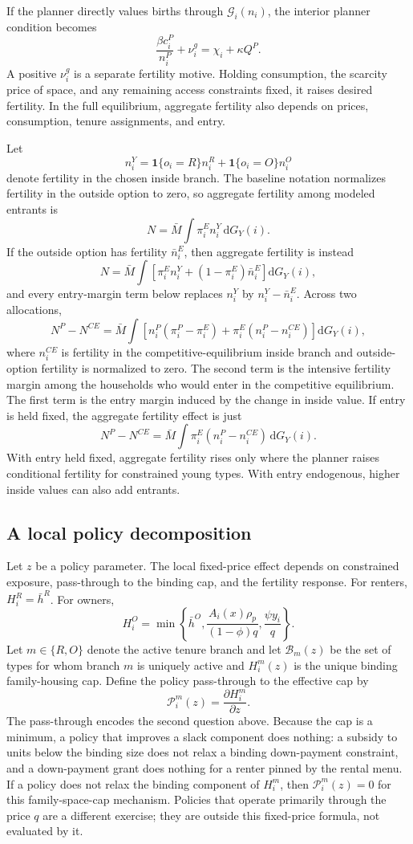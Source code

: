 \documentclass[11pt]{article}
\newcommand{\dd}{\mathrm d}
\newcommand{\1}{\mathbf 1}
\begin{document}
If the planner directly values births through $\mathcal G_i(n_i)$, the interior planner condition becomes
\[
\frac{\beta c_i^P}{n_i^P}+\nu_i^g
=
\chi_i+\kappa Q^{P}.
\]
A positive $\nu_i^g$ is a separate fertility motive. Holding consumption, the scarcity price of space, and any remaining access constraints fixed, it raises desired fertility. In the full equilibrium, aggregate fertility also depends on prices, consumption, tenure assignments, and entry.

Let
\[
n_i^Y=\1\{o_i=R\}n_i^R+\1\{o_i=O\}n_i^O
\]
denote fertility in the chosen inside branch. The baseline notation normalizes fertility in the outside option to zero, so aggregate fertility among modeled entrants is
\[
N
=
\bar M\int \pi_i^E n_i^Y\,\dd G_Y(i).
\]
If the outside option has fertility $\bar n_i^E$, then aggregate fertility is instead
\[
N
=
\bar M\int
\left[
\pi_i^E n_i^Y+(1-\pi_i^E)\bar n_i^E
\right]\dd G_Y(i),
\]
and every entry-margin term below replaces $n_i^Y$ by $n_i^Y-\bar n_i^E$.
Across two allocations,
\[
N^P-N^{CE}
=
\bar M\int
\left[
n_i^P(\pi_i^P-\pi_i^E)
+
\pi_i^E(n_i^P-n_i^{CE})
\right]\dd G_Y(i),
\]
where \(n_i^{CE}\) is fertility in the competitive-equilibrium inside branch and outside-option fertility is normalized to zero. The second term is the intensive fertility margin among the households who would enter in the competitive equilibrium. The first term is the entry margin induced by the change in inside value. If entry is held fixed, the aggregate fertility effect is just
\[
N^P-N^{CE}
=
\bar M\int
\pi_i^E(n_i^P-n_i^{CE})\,\dd G_Y(i).
\]
With entry held fixed, aggregate fertility rises only where the planner raises conditional fertility for constrained young types. With entry endogenous, higher inside values can also add entrants.

\subsection{A local policy decomposition}

Let $z$ be a policy parameter. The local fixed-price effect depends on constrained exposure, pass-through to the binding cap, and the fertility response. For renters, $H_i^R=\bar h^R$. For owners,
\[
H_i^O
=
\min\left\{
\bar h^O,
\frac{A_i(x)\rho_p}{(1-\phi)q},
\frac{\psi y_i}{q}
\right\}.
\]
Let $m\in\{R,O\}$ denote the active tenure branch and let $\mathcal B_m(z)$ be the set of types for whom branch $m$ is uniquely active and $H_i^m(z)$ is the unique binding family-housing cap. Define the policy pass-through to the effective cap by
\[
\mathcal P_i^m(z)=\frac{\partial H_i^m}{\partial z}.
\]
The pass-through encodes the second question above. Because the cap is a minimum, a policy that improves a slack component does nothing: a subsidy to units below the binding size does not relax a binding down-payment constraint, and a down-payment grant does nothing for a renter pinned by the rental menu. If a policy does not relax the binding component of $H_i^m$, then $\mathcal P_i^m(z)=0$ for this family-space-cap mechanism. Policies that operate primarily through the price $q$ are a different exercise; they are outside this fixed-price formula, not evaluated by it.
\end{document}

